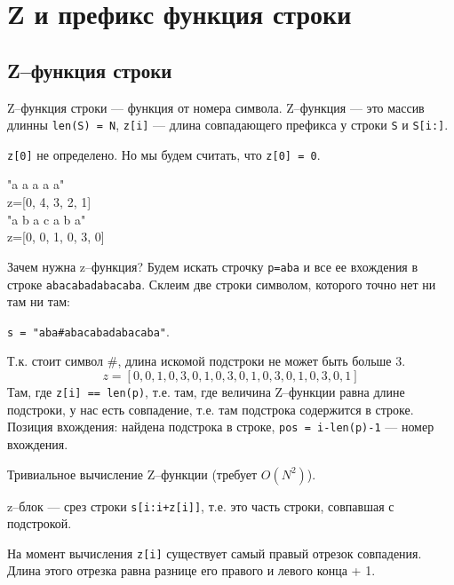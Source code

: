 \chapter{Z и префикс функция строки}
\section{Z--функция строки}
Z--функция строки --- функция от номера символа.
Z--функция --- это массив длинны \texttt{len(S) = N}, \texttt{z[i]} --- длина совпадающего префикса у строки \texttt{S} и \texttt{S[i:]}.

\texttt{z[0]} не определено. Но мы будем считать, что \texttt{z[0] = 0}. 

\begin{center}
"a a a a a"\\
z=[0, 4, 3, 2, 1]\\

"a b a c a b a"\\
z=[0, 0, 1, 0, 3, 0]
\end{center}

Зачем нужна z--функция?
Будем искать строчку \texttt{p=aba} и все ее вхождения в строке \texttt{abacabadabacaba}. Склеим две строки символом, которого точно нет ни там ни там:
\begin{center}
	\texttt{s = "aba\#abacabadabacaba"}.
\end{center}
Т.к. стоит символ \#, длина искомой подстроки не может быть больше 3.
$$
z = [0, 0, 1, 0, 3, 0, 1, 0, 3, 0, 1, 0, 3, 0, 1, 0, 3, 0, 1]
$$
Там, где \texttt{z[i] == len(p)}, т.е. там, где величина Z--функции равна длине подстроки, у нас есть совпадение, т.е. там подстрока содержится в строке. Позиция вхождения: найдена подстрока в строке, \texttt{pos = i-len(p)-1} --- номер вхождения.

Тривиальное вычисление Z--функции (требует $O(N^2)$).
z--блок --- срез строки \texttt{s[i:i+z[i]]}, т.е. это часть строки, совпавшая с подстрокой.

На момент вычисления \texttt{z[i]} существует самый правый отрезок совпадения. Длина этого отрезка равна разнице его правого и левого конца + 1.

